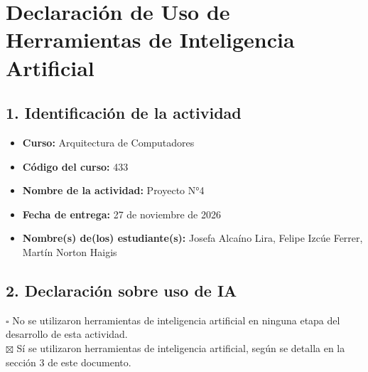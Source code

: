 \documentclass[11pt,letterpaper]{article}
\newcommand{\FechaEntrega}{27 de noviembre de 2026}
\begin{document}
\clearpage
\section*{Declaración de Uso de Herramientas de Inteligencia Artificial}

\subsection*{1. Identificación de la actividad}
\begin{itemize}
\item \textbf{Curso:} Arquitectura de Computadores
\item \textbf{Código del curso:} 433
\item \textbf{Nombre de la actividad:} Proyecto N°4
\item \textbf{Fecha de entrega:} \FechaEntrega
\item \textbf{Nombre(s) de(los) estudiante(s):} Josefa Alcaíno Lira, Felipe Izcúe Ferrer, Martín Norton Haigis
\end{itemize}

\subsection*{2. Declaración sobre uso de IA}
$\square$ No se utilizaron herramientas de inteligencia artificial en ninguna etapa del desarrollo de esta
actividad.\\
$\boxtimes$ Sí se utilizaron herramientas de inteligencia artificial, según se detalla en la sección 3 de este
documento.

\clearpage
\end{document}
